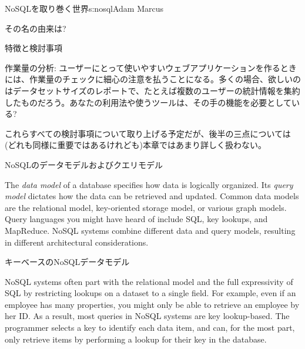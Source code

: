 \begin{aosachapter}{NoSQLを取り巻く世界}{s:nosql}{Adam Marcus}
\begin{aosasect1}{その名の由来は?}
\begin{aosasect2}{特徴と検討事項}
\begin{aosadescription}
  \item{作業量の分析}: ユーザーにとって使いやすいウェブアプリケーションを作るときには、作業量のチェックに細心の注意を払うことになる。多くの場合、欲しいのはデータセットサイズのレポートで、たとえば複数のユーザーの統計情報を集約したものだろう。あなたの利用法や使うツールは、その手の機能を必要としている?

\end{aosadescription}

これらすべての検討事項について取り上げる予定だが、後半の三点については(どれも同様に重要ではあるけれども)本章ではあまり詳しく扱わない。

\end{aosasect2}

\end{aosasect1}

\begin{aosasect1}{NoSQLのデータモデルおよびクエリモデル}

The \emph{data model} of a database specifies how data is logically
organized.  Its \emph{query model} dictates how the data can be
retrieved and updated.  Common data models are the relational model,
key-oriented storage model, or various graph models.  Query languages
you might have heard of include SQL, key lookups, and MapReduce.
NoSQL systems combine different data and query models, resulting in
different architectural considerations.

\begin{aosasect2}{キーベースのNoSQLデータモデル}

NoSQL systems often part with the relational model and the full
expressivity of SQL by restricting lookups on a dataset to a single
field.  For example, even if an employee has many properties, you
might only be able to retrieve an employee by her ID\@.  As a result,
most queries in NoSQL systems are key lookup-based.  The programmer
selects a key to identify each data item, and can, for the most part,
only retrieve items by performing a lookup for their key in the
database.


\end{aosasect2}
\end{aosasect1}
\end{aosachapter}
